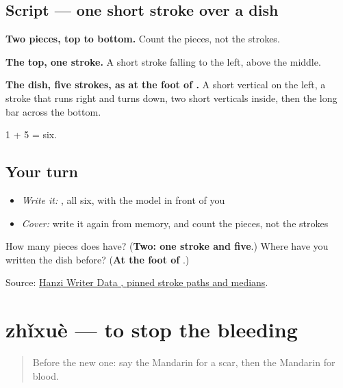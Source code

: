 \subsection*{Script — one short stroke over a dish}

\begin{quote}
\end{quote}

\textbf{Two pieces, top to bottom.} Count the pieces, not the strokes.

\textbf{The top, one stroke.} A short stroke falling to the left, above the middle.

\textbf{The dish, five strokes, as at the foot of .} A short vertical on the left, a stroke that runs right and turns down, two short verticals inside, then the long bar across the bottom.

1 + 5 = six.

\subsection*{Your turn}
\begin{itemize}
\raggedright
  \item \emph{Write it:} , all six, with the model in front of you
  \item \emph{Cover:} write it again from memory, and count the pieces, not the strokes
\end{itemize}

\begin{tcolorbox}[breakable,colback=teal!4,colframe=teal!35!black,title={Before you move on}]
How many pieces does  have? (\textbf{Two: one stroke and five}.) Where have you written the dish before? (\textbf{At the foot of }.)

Source: \href{https://raw.githubusercontent.com/chanind/hanzi-writer-data/68d10a4b21150cae5e1ebbd223eed289cf32d90c/data/\%E8\%A1\%80.json}{Hanzi Writer Data , pinned stroke paths and medians}.
\end{tcolorbox}
\section[zhǐxuè]{zhǐxuè — to stop the bleeding}

\label{lesson:ZH-C479-zhixue}



\begin{quote}
Before the new one: say the Mandarin for a scar, then the Mandarin for blood.
\end{quote}

